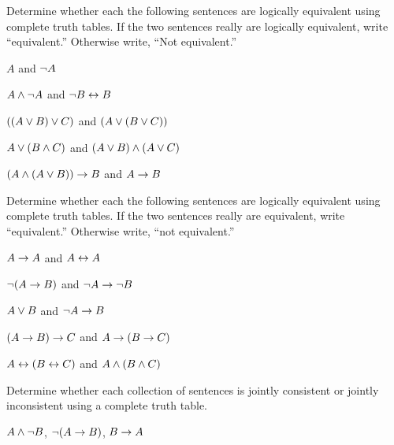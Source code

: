 \begin{practiceproblems}
	\noindent\problempart
	\label{pr:TT:equiv}
	Determine whether each the following sentences are logically equivalent using complete truth tables. If the two sentences really are logically equivalent, write ``equivalent.'' Otherwise write, ``Not equivalent.''
	\begin{problemslist}
		\item $A$ and $\neg A$
		\item $A \mathbin{\wedge} \neg A$ and $\neg B \leftrightarrow B$
		\item $((A \vee B) \vee C)$ and $(A \vee (B \vee C))$
		\item $A \vee (B \mathbin{\wedge} C)$ and $(A \vee B) \mathbin{\wedge} (A \vee C)$
		\item $(A \mathbin{\wedge} (A \vee B)) \rightarrow B$ and $A \rightarrow B$\end{problemslist}
	
	
	\problempart
	\label{pr:TT:equiv2}
	Determine whether each the following sentences are logically equivalent using complete truth tables. If the two sentences really are equivalent, write ``equivalent.'' Otherwise write, ``not equivalent.''
	\begin{problemslist}
		\item $A\rightarrow A$ and $A \leftrightarrow A$
		\item $\neg(A \rightarrow B)$ and $\neg A \rightarrow \neg B$
		\item $A \vee B$ and $\neg A \rightarrow B$
		\item$(A \rightarrow B) \rightarrow C$ and $A \rightarrow (B \rightarrow C)$
		\item $A \leftrightarrow (B \leftrightarrow C)$ and $A \mathbin{\wedge} (B \mathbin{\wedge} C)$
	\end{problemslist}
	
	
	\problempart
	\label{pr:TT:consistent2}
	Determine whether each collection of sentences is jointly consistent or jointly inconsistent using a complete truth table.
	\begin{problemslist}
		\item $A \mathbin{\wedge} \neg B$, $\neg(A \rightarrow B)$, $B \rightarrow A$\vspace{.5ex} %
		
		

\end{problemslist}
\end{practiceproblems}
